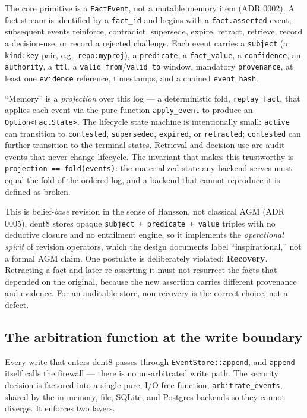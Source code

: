 \documentclass[11pt]{article}
\newcommand{\code}[1]{\texttt{#1}}
\begin{document}
The core primitive is a \code{FactEvent}, not a mutable memory item (ADR 0002). A fact stream is identified by a \code{fact\_id} and begins with a \code{fact.asserted} event; subsequent events reinforce, contradict, supersede, expire, retract, retrieve, record a decision-use, or record a rejected challenge. Each event carries a \code{subject} (a \code{kind:key} pair, e.g.\ \code{repo:myproj}), a \code{predicate}, a \code{fact\_value}, a \code{confidence}, an \code{authority}, a \code{ttl}, a \code{valid\_from}/\code{valid\_to} window, mandatory \code{provenance}, at least one \code{evidence} reference, timestamps, and a chained \code{event\_hash}.

``Memory'' is a \emph{projection} over this log --- a deterministic fold, \code{replay\_fact}, that applies each event via the pure function \code{apply\_event} to produce an \code{Option<FactState>}. The lifecycle state machine is intentionally small: \code{active} can transition to \code{contested}, \code{superseded}, \code{expired}, or \code{retracted}; \code{contested} can further transition to the terminal states. Retrieval and decision-use are audit events that never change lifecycle. The invariant that makes this trustworthy is \code{projection == fold(events)}: the materialized state any backend serves must equal the fold of the ordered log, and a backend that cannot reproduce it is defined as broken.

This is belief-\emph{base} revision in the sense of Hansson, not classical AGM (ADR 0005). dent8 stores opaque \code{subject + predicate + value} triples with no deductive closure and no entailment engine, so it implements the \emph{operational spirit} of revision operators, which the design documents label ``inspirational,'' not a formal AGM claim. One postulate is deliberately violated: \textbf{Recovery}. Retracting a fact and later re-asserting it must not resurrect the facts that depended on the original, because the new assertion carries different provenance and evidence. For an auditable store, non-recovery is the correct choice, not a defect.

\subsection{The arbitration function at the write boundary}

Every write that enters dent8 passes through \code{EventStore::append}, and \code{append} itself calls the firewall --- there is no un-arbitrated write path. The security decision is factored into a single pure, I/O-free function, \code{arbitrate\_events}, shared by the in-memory, file, SQLite, and Postgres backends so they cannot diverge. It enforces two layers.
\end{document}
